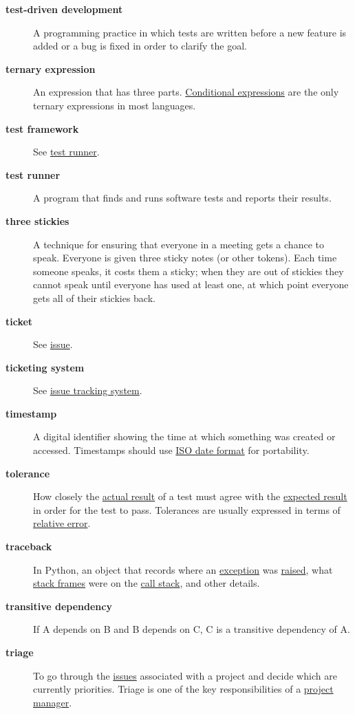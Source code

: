 \documentclass[
]{krantz}
\begin{document}
\begin{description}
\item[\textbf{test-driven development}]
A programming practice in which tests are written before a new feature is added or a bug is fixed in order to clarify the goal.
\item[\textbf{ternary expression}]
An expression that has three parts. \protect\hyperlink{conditional_expression}{Conditional expressions} are the only ternary expressions in most languages.
\item[\textbf{test framework}]
See \protect\hyperlink{test_runner}{test runner}.
\item[\textbf{test runner}]
A program that finds and runs software tests and reports their results.
\item[\textbf{three stickies}]
A technique for ensuring that everyone in a meeting gets a chance to speak. Everyone is given three sticky notes (or other tokens). Each time someone speaks, it costs them a sticky; when they are out of stickies they cannot speak until everyone has used at least one, at which point everyone gets all of their stickies back.
\item[\textbf{ticket}]
See \protect\hyperlink{issue}{issue}.
\item[\textbf{ticketing system}]
See \protect\hyperlink{issue_tracking_system}{issue tracking system}.
\item[\textbf{timestamp}]
A digital identifier showing the time at which something was created or accessed. Timestamps should use \protect\hyperlink{iso_date_format}{ISO date format} for portability.
\item[\textbf{tolerance}]
How closely the \protect\hyperlink{actual_result}{actual result} of a test must agree with the \protect\hyperlink{expected_result}{expected result} in order for the test to pass. Tolerances are usually expressed in terms of \protect\hyperlink{relative_error}{relative error}.
\item[\textbf{traceback}]
In Python, an object that records where an \protect\hyperlink{exception}{exception} was \protect\hyperlink{raise_exception}{raised}, what \protect\hyperlink{stack_frame}{stack frames} were on the \protect\hyperlink{call_stack}{call stack}, and other details.
\item[\textbf{transitive dependency}]
If A depends on B and B depends on C, C is a transitive dependency of A.
\item[\textbf{triage}]
To go through the \protect\hyperlink{issue}{issues} associated with a project and decide which are currently priorities. Triage is one of the key responsibilities of a \protect\hyperlink{project_manager}{project manager}.

\end{description}
\end{document}
